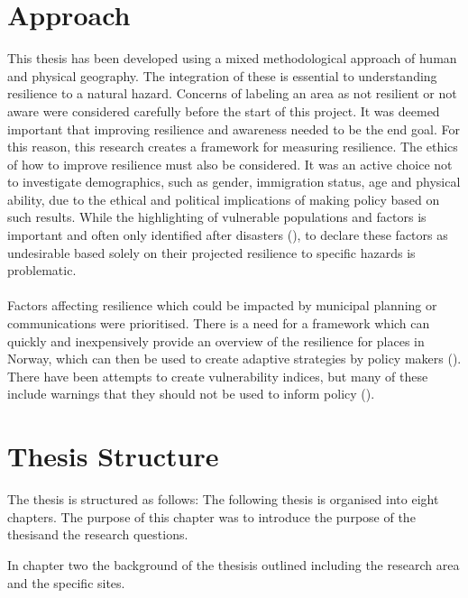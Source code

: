 \section{Approach}

This thesis has been developed using a mixed methodological approach of human and physical geography. The integration of these is essential to understanding resilience to a natural hazard. Concerns of labeling an area as not resilient or not aware were considered carefully before the start of this project.  It was deemed important that improving resilience and awareness needed to be the end goal. For this reason, this research creates a framework for measuring resilience. The ethics of how to improve resilience must also be considered. It was an active choice not to investigate demographics, such as gender, immigration status, age and physical ability, due to the ethical and political implications of making policy based on such results. While the highlighting of vulnerable populations and factors is important and often only identified after disasters (\cite{cutter_community_2020}), to declare these factors as undesirable based solely on their projected resilience to specific hazards is problematic. 

\paragraph{}
Factors affecting resilience which could be impacted by municipal planning or communications were prioritised. There is a need for a framework which can quickly and inexpensively provide an overview of the resilience for places in Norway, which can then be used to create adaptive strategies by policy makers (\cite{opach_seeking_2020}). There have been attempts to create vulnerability indices, but many of these include warnings that they should not be used to inform policy (\cite{opach_seeking_2020}).


\section{Thesis Structure}
The thesis is structured as follows: 
The following thesis is organised into eight chapters. The purpose of this chapter was to introduce the purpose of the thesisand the research questions.

In chapter two the background of the thesisis outlined including the research area and the specific sites. 

